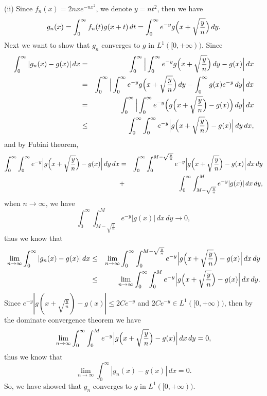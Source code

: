 \documentclass[12pt,a4paper]{ctexart}
\begin{document}
(ii) Since $f_{n} (x) = 2 n x e^{-n x^{2}}$, we denote $y = n t^{2}$, then we have
\begin{equation*}
    g_{n} (x) = \int_{0}^{\infty} f_{n} (t) g(x + t) \, d t = \int_{0}^{\infty} e^{-y} g \Big{(} x + \sqrt{\frac{y}{n}} \Big{)} \, d y.
\end{equation*}
Next we want to show that $g_{n}$ converges to $g$ in $L^{1}([0, + \infty))$. Since
\begin{eqnarray*}
\int_{0}^{\infty} |g_{n}(x) - g(x)| \, d x & = &  \int_{0}^{\infty} \Big{|} \int_{0}^{\infty}  e^{-y} g \Big{(} x + \sqrt{\frac{y}{n}} \Big{)} \, d y  - g(x) \Big{|} \, d x \\
& = &  \int_{0}^{\infty} \Big{|} \int_{0}^{\infty}  e^{-y} g \Big{(} x + \sqrt{\frac{y}{n}} \Big{)} \, d y  - \int_{0}^{\infty} g(x) e^{-y} \, d y  \Big{|} \, d x  \\
& = &  \int_{0}^{\infty} \Big{|} \int_{0}^{\infty}  e^{-y} \Big{(} g \Big{(} x + \sqrt{\frac{y}{n}} \Big{)}  - g(x) \Big{)} \, d y \Big{|} \, d x \\
& \leq & \int_{0}^{\infty} \int_{0}^{\infty}  e^{-y} \Big{|} g \Big{(} x + \sqrt{\frac{y}{n}} \Big{)}  - g(x) \Big{|} \, d y \, d x,
\end{eqnarray*}
and by Fubini theorem,
\begin{eqnarray*}
\int_{0}^{\infty} \int_{0}^{\infty}  e^{-y} \Big{|} g \Big{(} x + \sqrt{\frac{y}{n}} \Big{)}  - g(x) \Big{|} \, d y \, d x & = &  \int_{0}^{\infty} \int_{0}^{M - \sqrt{\frac{y}{n}}}  e^{-y} \Big{|} g \Big{(} x + \sqrt{\frac{y}{n}} \Big{)}  - g(x) \Big{|} \, d x \, d y \\
& + & \int_{0}^{\infty} \int_{M - \sqrt{\frac{y}{n}}}^{M}  e^{-y} | g(x) | \, d x \, d y ,
\end{eqnarray*}
when $n \to \infty$, we have
\begin{equation*}
    \int_{0}^{\infty} \int_{M - \sqrt{\frac{y}{n}}}^{M}  e^{-y} | g(x) | \, d x \, d y \to 0,
\end{equation*}
thus we know that
\begin{eqnarray*}
 \lim_{n \to \infty} \int_{0}^{\infty} |g_{n}(x) - g(x)| \, d x  & \leq & \lim_{n \to \infty}  \int_{0}^{\infty} \int_{0}^{M - \sqrt{\frac{y}{n}}}  e^{-y} \Big{|} g \Big{(} x + \sqrt{\frac{y}{n}} \Big{)}  - g(x) \Big{|} \, d x \, d y \\
 & \leq & \lim_{n \to \infty}  \int_{0}^{\infty} \int_{0}^{M}  e^{-y} \Big{|} g \Big{(} x + \sqrt{\frac{y}{n}} \Big{)}  - g(x) \Big{|} \, d x \, d y.
\end{eqnarray*}
Since $e^{-y} | g ( x + \sqrt{\frac{y}{n}} )  - g(x) | \leq 2 C e^{-y}$ and $2 C e^{-y} \in L^{1}([0, + \infty))$, then by the dominate convergence theorem we have
\begin{equation*}
    \lim_{n \to \infty}  \int_{0}^{\infty} \int_{0}^{M}  e^{-y} \Big{|} g \Big{(} x + \sqrt{\frac{y}{n}} \Big{)}  - g(x) \Big{|} \, d x \, d y = 0,
\end{equation*}
thus we know that 
\begin{equation*}
    \lim_{n \to \infty} \int_{0}^{\infty} |g_{n}(x) - g(x)| \, d x  = 0.
\end{equation*}
So, we have showed that $g_{n}$ converges to $g$ in $L^{1}([0, + \infty))$.
\end{document}
